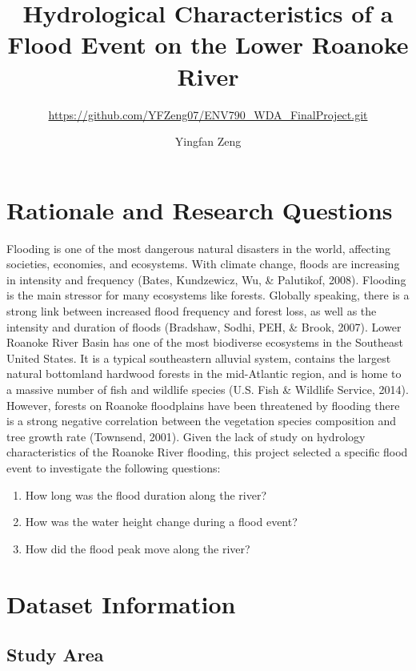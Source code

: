 \documentclass[12pt,]{article}
\title{Hydrological Characteristics of a Flood Event on the Lower Roanoke River}
\subtitle{\url{https://github.com/YFZeng07/ENV790_WDA_FinalProject.git}}
\author{Yingfan Zeng}
\date{}
\providecommand{\tightlist}{%
  \setlength{\itemsep}{0pt}\setlength{\parskip}{0pt}}
\begin{document}
\maketitle

\newpage

\section{Rationale and Research
Questions}\label{rationale-and-research-questions}

Flooding is one of the most dangerous natural disasters in the world,
affecting societies, economies, and ecosystems. With climate change,
floods are increasing in intensity and frequency (Bates, Kundzewicz, Wu,
\& Palutikof, 2008). Flooding is the main stressor for many ecosystems
like forests. Globally speaking, there is a strong link between
increased flood frequency and forest loss, as well as the intensity and
duration of floods (Bradshaw, Sodhi, PEH, \& Brook, 2007). Lower Roanoke
River Basin has one of the most biodiverse ecosystems in the Southeast
United States. It is a typical southeastern alluvial system, contains
the largest natural bottomland hardwood forests in the mid-Atlantic
region, and is home to a massive number of fish and wildlife species
(U.S. Fish \& Wildlife Service, 2014). However, forests on Roanoke
floodplains have been threatened by flooding there is a strong negative
correlation between the vegetation species composition and tree growth
rate (Townsend, 2001). Given the lack of study on hydrology
characteristics of the Roanoke River flooding, this project selected a
specific flood event to investigate the following questions:

\begin{enumerate}
\def\labelenumi{\arabic{enumi}.}
\tightlist
\item
  How long was the flood duration along the river?
\item
  How was the water height change during a flood event?
\item
  How did the flood peak move along the river?
\end{enumerate}

\newpage

\section{Dataset Information}\label{dataset-information}

\subsection{Study Area}\label{study-area}
\end{document}
